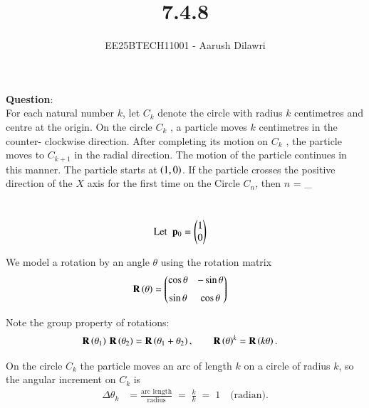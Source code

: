 \documentclass[journal]{IEEEtran}
\begin{document}

\vspace{3cm}

\title{7.4.8}
\author{EE25BTECH11001 - Aarush Dilawri}
\maketitle
{\let\newpage\relax\maketitle}

\renewcommand{\thefigure}{\theenumi}
\renewcommand{\thetable}{\theenumi}
\setlength{\intextsep}{10pt} %


\renewcommand{\thetable}{\theenumi}

\textbf{Question}:\\
For each natural number $k$, let $C_k$ denote the circle with radius $k$ centimetres and
centre at the origin. On the circle $C_k$ , a particle moves $k$ centimetres in the counter-
clockwise direction. After completing its motion on $C_k$ , the particle moves to $C_{k+1}$ in the radial direction. The motion of the particle continues in this manner. The particle
starts at $\left(1,0\right)$. If the particle crosses the positive direction of the $X$ axis for the first time on the Circle $C_n$, then $n$ = \_

\solution \\

\begin{align}
    \text{Let }\; \mathbf{p}_0 &= \begin{pmatrix}1 \\ 0\end{pmatrix} 
\end{align}

We model a rotation by an angle $\theta$ using the rotation matrix
\begin{align}
    \mathbf{R}\left(\theta\right) &= \begin{pmatrix}\cos\theta & -\sin\theta \\[6pt] \sin\theta & \cos\theta\end{pmatrix}
\end{align}

Note the group property of rotations:
\begin{align}
    \mathbf{R}\left(\theta_1\right)\,\mathbf{R}\left(\theta_2\right) &= \mathbf{R}\left(\theta_1+\theta_2\right),
    \qquad \mathbf{R}\left(\theta\right)^k = \mathbf{R}\left(k\theta\right).
\end{align}

On the circle $C_k$ the particle moves an arc of length $k$ on a circle of radius $k$, 
so the angular increment on $C_k$ is
\begin{align}
    \Delta\theta_k &= \frac{\text{arc length}}{\text{radius}} \;=\; \frac{k}{k} \;=\; 1 \quad\text{(radian).}
\end{align}
\end{document}
